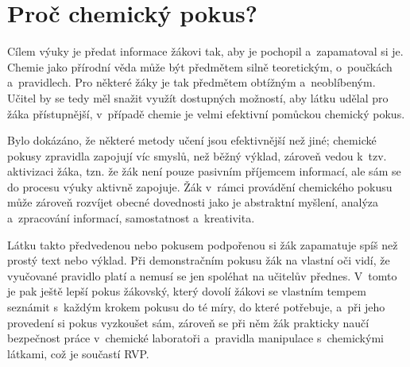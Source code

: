 \section{Proč chemický pokus?}
Cílem výuky je předat informace žákovi tak, aby je pochopil a~zapamatoval si je. Chemie jako přírodní věda může být předmětem silně teoretickým, o~poučkách a~pravidlech. Pro některé žáky je tak předmětem obtížným a~neoblíbeným. \cite{oblibenost} Učitel by se tedy měl snažit využít dostupných možností, aby látku udělal pro žáka přístupnější, v~případě chemie je velmi efektivní pomůckou chemický pokus.

Bylo dokázáno, že některé metody učení jsou efektivnější než jiné; \cite{badani} chemické pokusy zpravidla zapojují víc smyslů, než běžný výklad, zároveň vedou k~tzv. aktivizaci žáka, tzn. že žák není pouze pasivním příjemcem informací, ale sám se do procesu výuky aktivně zapojuje. \cite{aktivizace} Žák v~rámci provádění chemického pokusu může zároveň rozvíjet obecné dovednosti jako je abstraktní myšlení, analýza a~zpracování informací, samostatnost a~kreativita. \cite{ostrava} \cite{aktivizace}

Látku takto předvedenou nebo pokusem podpořenou si žák zapamatuje spíš než prostý text nebo výklad. \cite{badani} Při demonstračním pokusu žák na vlastní oči vidí, že vyučované pravidlo platí a nemusí se jen spoléhat na učitelův přednes. V~tomto je pak ještě lepší pokus žákovský, který dovolí žákovi se vlastním tempem seznámit s~každým krokem pokusu do té míry, do které potřebuje, a~při jeho provedení si pokus vyzkoušet sám, zároveň se při něm žák prakticky naučí bezpečnost práce v~chemické laboratoři a~pravidla manipulace s~chemickými látkami, což je součastí RVP.


